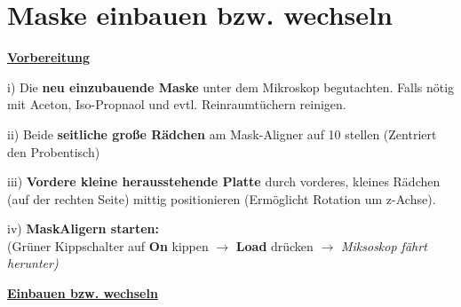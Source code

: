 \documentclass[12pt,a4paper]{article}
\begin{document}
\newpage

\section{Maske einbauen bzw. wechseln}
\begin{center}
\textbf{\underline{Vorbereitung}}
\end{center}
\begin{description}
\item i) Die \textbf{neu einzubauende Maske} unter dem Mikroskop begutachten. Falls nötig mit Aceton, Iso-Propnaol und evtl. Reinraumtüchern reinigen.
\item ii) Beide \textbf{seitliche große Rädchen} am Mask-Aligner auf 10 stellen (Zentriert den Probentisch)
\item iii) \textbf{Vordere kleine herausstehende Platte} durch vorderes, kleines Rädchen (auf der rechten Seite) mittig positionieren (Ermöglicht Rotation um z-Achse).
\item iv) \textbf{MaskAligern starten:\footnotemark[1]}\\ 
(Grüner Kippschalter auf \textbf{On} kippen $\rightarrow$ \textbf{Load} drücken $\rightarrow$ \textit{Miksoskop fährt herunter)}
\end{description}

\bigskip

\begin{center}
\textbf{\underline{Einbauen bzw. wechseln}}
\end{center}
\end{document}
